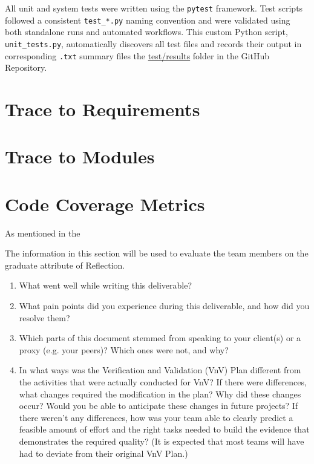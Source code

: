 \documentclass[12pt, titlepage]{article}
\begin{document}
All unit and system tests were written using the \texttt{pytest} framework. Test scripts followed a consistent \texttt{test\_*.py} naming convention and were validated using both standalone runs and automated workflows. This custom Python script, \texttt{unit\_tests.py}, automatically discovers all test files and records their output in corresponding \texttt{.txt} summary files the \href{https://github.com/AliyahJimoh/2D-Localizer/tree/main/test/results}{test/results} folder in the GitHub Repository.

		
\section{Trace to Requirements}
		
\section{Trace to Modules}		

\section{Code Coverage Metrics}

As mentioned in the 




\newpage{}

The information in this section will be used to evaluate the team members on the
graduate attribute of Reflection.

\begin{enumerate}
  \item What went well while writing this deliverable? 
  \item What pain points did you experience during this deliverable, and how
    did you resolve them?
  \item Which parts of this document stemmed from speaking to your client(s) or
  a proxy (e.g. your peers)? Which ones were not, and why?
  \item In what ways was the Verification and Validation (VnV) Plan different
  from the activities that were actually conducted for VnV?  If there were
  differences, what changes required the modification in the plan?  Why did
  these changes occur?  Would you be able to anticipate these changes in future
  projects?  If there weren't any differences, how was your team able to clearly
  predict a feasible amount of effort and the right tasks needed to build the
  evidence that demonstrates the required quality?  (It is expected that most
  teams will have had to deviate from their original VnV Plan.) \cite{Barfoot2017}
\end{enumerate}
\end{document}
